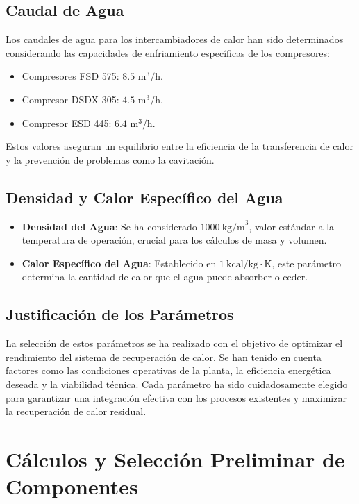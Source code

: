 \documentclass[11pt,a4paper]{article}  %
\begin{document}
\subsection{Caudal de Agua}
Los caudales de agua para los intercambiadores de calor han sido determinados considerando las capacidades de enfriamiento específicas de los compresores:
\begin{itemize}
    \item Compresores FSD 575: \(8.5 \text{ m}^3\text{/h}\).
    \item Compresor DSDX 305: \(4.5 \text{ m}^3\text{/h}\).
    \item Compresor ESD 445: \(6.4 \text{ m}^3\text{/h}\).
\end{itemize}
Estos valores aseguran un equilibrio entre la eficiencia de la transferencia de calor y la prevención de problemas como la cavitación.

\subsection{Densidad y Calor Específico del Agua}
\begin{itemize}
    \item \textbf{Densidad del Agua}: Se ha considerado \(1000~\text{kg/m}^3\), valor estándar a la temperatura de operación, crucial para los cálculos de masa y volumen.
    \item \textbf{Calor Específico del Agua}: Establecido en \(1~\text{kcal/kg}\cdot\text{K}\), este parámetro determina la cantidad de calor que el agua puede absorber o ceder.
\end{itemize}

\subsection{Justificación de los Parámetros}
La selección de estos parámetros se ha realizado con el objetivo de optimizar el rendimiento del sistema de recuperación de calor. Se han tenido en cuenta factores como las condiciones operativas de la planta, la eficiencia energética deseada y la viabilidad técnica. Cada parámetro ha sido cuidadosamente elegido para garantizar una integración efectiva con los procesos existentes y maximizar la recuperación de calor residual.

\section{Cálculos y Selección Preliminar de Componentes}
\end{document}

